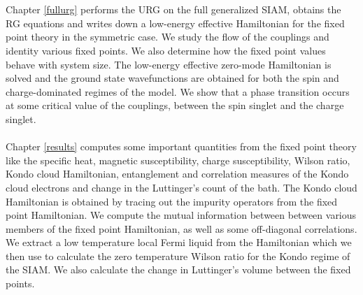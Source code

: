 \documentclass[twoside]{report}
\numberwithin{equation}{section}
\begin{document}
\\\\ Chapter \ref{fullurg} performs the URG on the full generalized SIAM, obtains the RG equations and writes down a low-energy effective Hamiltonian for the fixed point theory in the symmetric case. We study the flow of the couplings and identity various fixed points. We also determine how the fixed point values behave with system size. The low-energy effective zero-mode Hamiltonian is solved and the ground state wavefunctions are obtained for both the spin and charge-dominated regimes of the model. We show that a phase transition occurs at some critical value of the couplings, between the spin singlet and the charge singlet.
\\\\ Chapter \ref{results} computes some important quantities from the fixed point theory like the specific heat, magnetic susceptibility, charge susceptibility, Wilson ratio, Kondo cloud Hamiltonian, entanglement and correlation measures of the Kondo cloud electrons and change in the Luttinger's count of the bath.  The Kondo cloud Hamiltonian is obtained by tracing out the impurity operators from the fixed point Hamiltonian. We compute the mutual information between between various members of the fixed point Hamiltonian, as well as some off-diagonal correlations. We extract a low temperature local Fermi liquid from the Hamiltonian which we then use to calculate the zero temperature Wilson ratio for the Kondo regime of the SIAM. We also calculate the change in Luttinger's volume between the fixed points.
\end{document}
